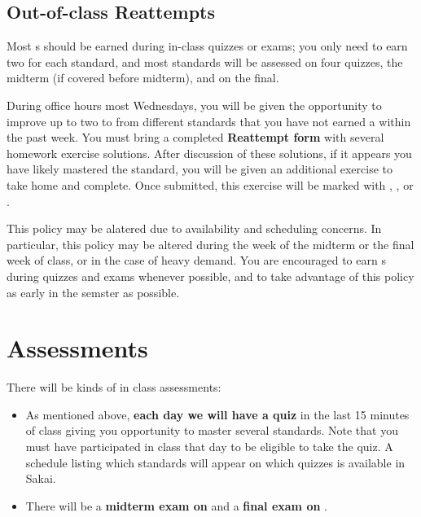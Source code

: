 \documentclass[letterpaper]{article}
\begin{document}
{    \subsection*{\fontsize{10}{12}\selectfont Out-of-class Reattempts}
    Most \masteryMark{}s should be earned during in-class quizzes or exams;
    you only need to earn two for each standard, and most standards will be
    assessed on four quizzes, the midterm (if covered before midterm), and
    on the final.

    During office hours most Wednesdays, you will be given the opportunity to
    improve up to two \reattemptMark{} to \masteryMark{} from different
    standards that you have not earned a \masteryMark{} within the past week.
    You must bring a completed \textbf{Reattempt form} with several homework
    exercise solutions. After discussion of these solutions, if it appears you
    have likely mastered the standard,
    you will be given an additional exercise to take home and complete.
    Once submitted, this exercise will be marked with \masteryMark{},
    \minorMark{}, or \noMark{}.

    This policy may be alatered due to availability and scheduling
    concerns. In particular, this policy may be altered during the week
    of the midterm or the final week of class, or in the case of heavy
    demand. You are encouraged to earn \masteryMark{}s during quizzes and
    exams whenever possible, and to take advantage of this policy
    as early in the semster as possible.
}




\section*{\fontsize{12}{15}\selectfont Assessments}
There will be  kinds of in class assessments:
\begin{itemize}
\item As mentioned above, {\bf each day we will have a quiz} in the last 15 minutes of class giving you opportunity to master several standards.  Note that you must have participated in class that day to be eligible to take the quiz.  A schedule listing which standards will appear on which quizzes is available in Sakai.
\item There will be a {\bf midterm exam on } and a {\bf final exam on }.
\end{itemize}
\end{document}
